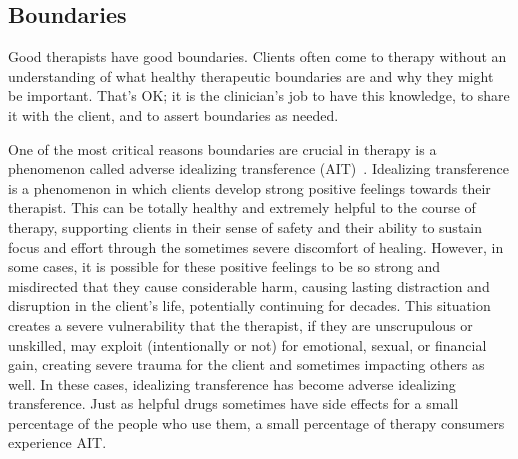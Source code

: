 \documentclass[11pt,oneside]{book}
\let\cite\parencite
\begin{document}
\subsection*{Boundaries}
\label{def:ait}
Good therapists have good boundaries. Clients often come to therapy without an understanding of what healthy therapeutic boundaries are and why they might be important. That's OK; it is the clinician's job to have this knowledge, to share it with the client, and to assert boundaries as needed.

One of the most critical reasons boundaries are crucial in therapy is a phenomenon called adverse idealizing transference (AIT)~\cite{hook2018boundary,transferranceLoveHarm}. Idealizing transference is a phenomenon in which clients develop strong positive feelings towards their therapist. This can be totally healthy and extremely helpful to the course of therapy, supporting clients in their sense of safety and their ability to sustain focus and effort through the sometimes severe discomfort of healing. However, in some cases, it is possible for these positive feelings to be so strong and misdirected that they cause considerable harm, causing lasting distraction and disruption in the client's life, potentially continuing for decades. This situation creates a severe vulnerability that the therapist, if they are unscrupulous or unskilled, may exploit (intentionally or not) for emotional, sexual, or financial gain, creating severe trauma for the client and sometimes impacting others as well. In these cases, idealizing transference has become adverse idealizing transference. Just as helpful drugs sometimes have side effects for a small percentage of the people who use them, a small percentage of therapy consumers experience AIT.
\end{document}
